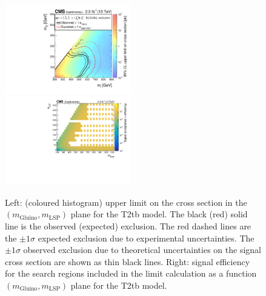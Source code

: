 \begin{figure}[t]
  \begin{center}
    \includegraphics[width=0.49\textwidth]{supplementary/figures/RA1T2tbXSEC} \, 
    \includegraphics[width=0.49\textwidth]{supplementary/figures/T2tb_merging_4_cats} \,     
  \end{center}
  \caption{Left: (coloured histogram) upper limit on the cross section in the $(m_{\mathrm{Gluino}},m_{\mathrm{LSP}})$ plane for the T2tb model. 
  The black (red) solid line is the observed (expected) exclusion. The red dashed lines are the $\pm1\sigma$ expected exclusion due to experimental uncertainties. 
  The $\pm1\sigma$ observed exclusion due to theoretical uncertainties on the signal cross section are shown as thin black lines. 
  Right: signal efficiency for the search regions included in the limit calculation as a function $(m_{\mathrm{Gluino}},m_{\mathrm{LSP}})$ plane for the T2tb model. 
  \label{fig:T2tb_excl}}
\end{figure}


